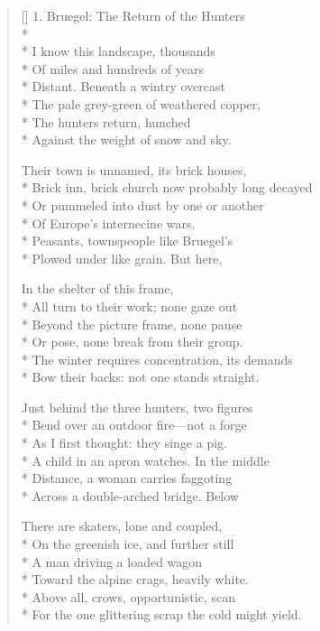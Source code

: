 \label{ch:the_cold}
\settowidth{\versewidth}{For the one glittering scrap the cold might yield.}
\begin{verse}[\versewidth]
1. Bruegel: The Return of the Hunters\\*
~\\*
I know this landscape, thousands\\*
Of miles and hundreds of years\\*
Distant.  Beneath a wintry overcast\\*
The pale grey-green of weathered copper,\\*
The hunters return, hunched\\*
Against the weight of snow and sky.

Their town is unnamed, its brick houses,\\*
Brick inn, brick church now probably long decayed\\*
Or pummeled into dust by one or another\\*
Of Europe's internecine wars.\\*
Peasants, townspeople like Bruegel's\\*
Plowed under like grain.   But here,

In the shelter of this frame,\\*
All turn to their work; none gaze out\\*
Beyond the picture frame, none pause\\*
Or pose, none break from their group.\\*
The winter requires concentration, its demands\\*
Bow their backs: not one stands straight.

Just behind the three hunters, two figures\\*
Bend over an outdoor fire---not a forge\\*
As I first thought: they singe a pig.\\*
A child in an apron watches. In the middle\\*
Distance, a woman carries faggoting \\*
Across a double-arched bridge. Below

There are skaters, lone and coupled,\\*
On the greenish ice, and further still\\*
A man driving a loaded wagon\\*
Toward the alpine crags, heavily white.\\*
Above all, crows, opportunistic, scan\\*
For the one glittering scrap the cold might yield.


\end{verse}
